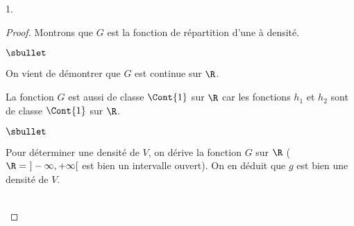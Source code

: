 \documentclass[11pt]{article}%
\begin{document}
\begin{noliste}{1.}
\begin{proof}
  


  \noindent
  Montrons que $G$ est la fonction de répartition d'une \var à
  densité.
  \begin{noliste}{$\sbullet$}
  \item On vient de démontrer que $G$ est continue sur $\R$.
  \item La fonction $G$ est aussi de classe $\Cont{1}$ sur $\R$ car
    les fonctions $h_1$ et $h_2$ sont de classe $\Cont{1}$ sur $\R$.
  \end{noliste}

\begin{noliste}{$\sbullet$}  
\item Pour déterminer une densité de $V$, on dérive la fonction $G$
  sur $\R$ ($\R = \ ]-\infty,+\infty[$ est bien un intervalle ouvert).
  On en déduit que $g$ est bien une densité de $V$.
 \end{noliste}
~\\[-1.3cm]
\end{proof}

\end{noliste} 



\end{document}
